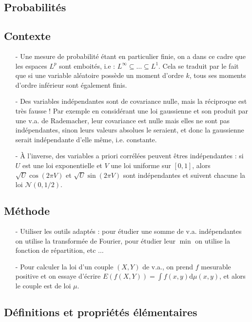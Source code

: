 \documentclass[11pt,a4paper]{article}
\begin{document}
\begin{center}
\section*{Probabilités} 
\end{center}

\subsection*{Contexte}
\begin{itemize}
\item[-] Une mesure de probabilité étant en particulier finie, on a dans ce cadre que les espaces $L^p$ sont emboités, i.e : $L^\infty \subseteq \dots \subseteq L^1$. Cela se traduit par le fait que si une variable aléatoire possède un moment d'ordre $k$, tous ses moments d'ordre inférieur sont également finis.
\item[-] Des variables indépendantes sont de covariance nulle, mais la réciproque est très fausse ! Par exemple en considérant une loi gaussienne et son produit par une v.a. de Rademacher, leur covariance est nulle mais elles ne sont pas indépendantes, sinon leurs valeurs absolues le seraient, et donc la gaussienne serait indépendante d'elle même, i.e. constante.
\item[-] À l'inverse, des variables a priori corrélées peuvent êtres indépendantes : si $U$ est une loi exponentielle et $V$ une loi uniforme sur $[0,1]$, alors $\sqrt{U}\cos(2\pi V)$ et $\sqrt{U}\sin(2\pi V)$ sont indépendantes et suivent chacune la loi $\mathcal{N}(0,1/2)$.
\end{itemize}

\subsection*{Méthode}
\begin{itemize}
\item[-] Utiliser les outils adaptés : pour étudier une somme de v.a. indépendantes on utilise la transformée de Fourier, pour étudier leur $\min$ on utilise la fonction de répartition, etc $\dots$
\item[-] Pour calculer la loi d'un couple $(X,Y)$ de v.a., on prend $f$ mesurable positive et on essaye d'écrire $\displaystyle E\left(f(X,Y)\right) = \int f(x,y) \mathrm{d}\mu(x,y)$, et alors le couple est de loi $\mu$.
\end{itemize}

\subsection*{Définitions et propriétés élémentaires}
\end{document}
